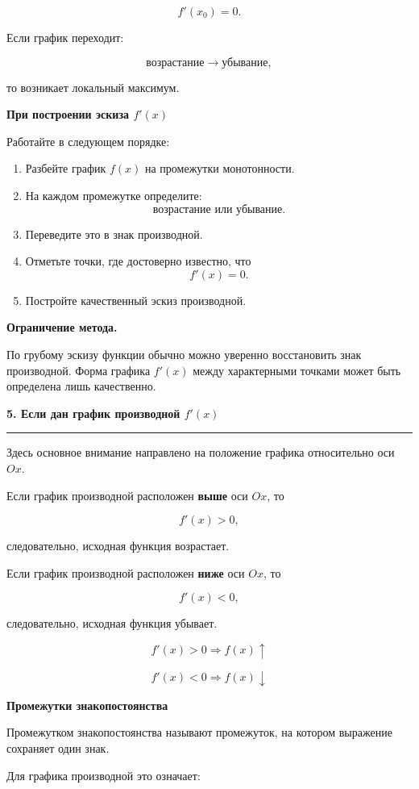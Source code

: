 \documentclass[a4paper,12pt]{article}
\newcommand{\maintitle}[1]{%
    {\Large\bfseries\color{darkaccent}#1\par}
    \vspace{2mm}
    {\color{accent}\rule{\linewidth}{0.6pt}}
    \vspace{4mm}
}
\newcommand{\subhead}[1]{%
    \vspace{3mm}
    {\large\bfseries\color{darkaccent}#1\par}
    \vspace{1mm}
}
\newcommand{\keypoint}[1]{%
    \par
    \vspace{1mm}
    {\color{darkaccent}\bfseries #1}
}
\begin{document}
\[
f'(x_0)=0.
\]

Если график переходит:

\[
\text{возрастание}\longrightarrow\text{убывание},
\]

то возникает локальный максимум.

\subhead{При построении эскиза \(f'(x)\)}

Работайте в следующем порядке:

\begin{enumerate}
    \item Разбейте график \(f(x)\) на промежутки монотонности.
    \item На каждом промежутке определите:
    \[
    \text{возрастание или убывание}.
    \]
    \item Переведите это в знак производной.
    \item Отметьте точки, где достоверно известно, что
    \[
    f'(x)=0.
    \]
    \item Постройте качественный эскиз производной.
\end{enumerate}

\keypoint{Ограничение метода.}
По грубому эскизу функции обычно можно уверенно восстановить знак
производной. Форма графика \(f'(x)\) между характерными точками
может быть определена лишь качественно.

\maintitle{5. Если дан график производной \(f'(x)\)}

Здесь основное внимание направлено на положение графика относительно
оси \(Ox\).

Если график производной расположен \textbf{выше} оси \(Ox\), то

\[
f'(x)>0,
\]

следовательно, исходная функция возрастает.

Если график производной расположен \textbf{ниже} оси \(Ox\), то

\[
f'(x)<0,
\]

следовательно, исходная функция убывает.

\[
\boxed{
f'(x)>0
\Longrightarrow
f(x)\uparrow
}
\]

\[
\boxed{
f'(x)<0
\Longrightarrow
f(x)\downarrow
}
\]

\subhead{Промежутки знакопостоянства}

Промежутком знакопостоянства называют промежуток, на котором выражение
сохраняет один знак.

Для графика производной это означает:
\end{document}
